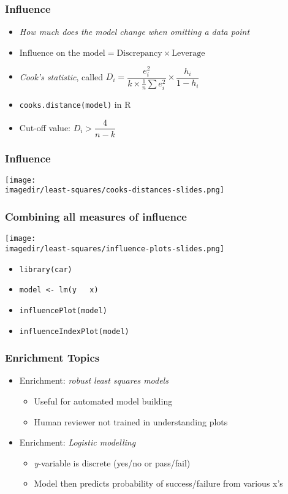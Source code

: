 \begin{frame}\frametitle{Influence}
	\begin{itemize}
		\item	\emph{How much does the model change when omitting a data point} 
		\item	$\text{Influence on the model} = \text{Discrepancy} \times \text{Leverage} $ 
		\item	\emph{Cook's statistic}, called $D_i = \dfrac{e_i^2}{k \times \frac{1}{n}\sum{e_i^2}} \times \dfrac{h_i}{1-h_i} $ 
		\item	\texttt{cooks.distance(model)} in R 
		\item	Cut-off value: $D_i > \dfrac{4}{n-k} $ 
	\end{itemize}
\end{frame}

\begin{frame}\frametitle{Influence}
	\begin{center}
		\texttt{[image: \\imagedir/least-squares/cooks-distances-slides.png]}
	\end{center}
\end{frame}

\begin{frame}\frametitle{Combining all measures of influence}
	\begin{center}
		\texttt{[image: \\imagedir/least-squares/influence-plots-slides.png]}
	\end{center}
	\begin{itemize}
		\item	\texttt{library(car)} 
		\item	\texttt{model <- lm(y \string~ x)} 
		\item	\texttt{influencePlot(model)} 
		\item	\texttt{influenceIndexPlot(model)} 
	\end{itemize}
\end{frame}

\begin{frame}\frametitle{Enrichment Topics}
	\begin{itemize}
		\item	Enrichment: \emph{ robust least squares models} 
		\begin{itemize}
			\item	Useful for automated model building 
			\item	Human reviewer not trained in understanding plots 
		\end{itemize}
		\item	Enrichment: \emph{Logistic modelling} 
		\begin{itemize}
			\item	\emph{y}-variable is discrete (yes/no or pass/fail) 
			\item	Model then predicts probability of success/failure from various x's 
		\end{itemize}
	\end{itemize}
\end{frame}

